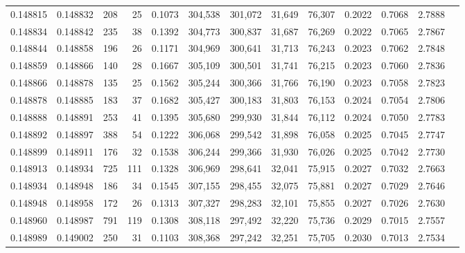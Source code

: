 \begin{tabular}{rrrrrrrrrrrrr}
0.148815 & 0.148832 &   208 &  25 &                                     0.1073 & 304,538 & 301,072 &  31,649 &  76,307 & 0.2022 & 0.7068 & 2.7888 \\
0.148834 & 0.148842 &   235 &  38 &                                     0.1392 & 304,773 & 300,837 &  31,687 &  76,269 & 0.2022 & 0.7065 & 2.7867 \\
0.148844 & 0.148858 &   196 &  26 &                                     0.1171 & 304,969 & 300,641 &  31,713 &  76,243 & 0.2023 & 0.7062 & 2.7848 \\
0.148859 & 0.148866 &   140 &  28 &                                     0.1667 & 305,109 & 300,501 &  31,741 &  76,215 & 0.2023 & 0.7060 & 2.7836 \\
0.148866 & 0.148878 &   135 &  25 &                                     0.1562 & 305,244 & 300,366 &  31,766 &  76,190 & 0.2023 & 0.7058 & 2.7823 \\
0.148878 & 0.148885 &   183 &  37 &                                     0.1682 & 305,427 & 300,183 &  31,803 &  76,153 & 0.2024 & 0.7054 & 2.7806 \\
0.148888 & 0.148891 &   253 &  41 &                                     0.1395 & 305,680 & 299,930 &  31,844 &  76,112 & 0.2024 & 0.7050 & 2.7783 \\
0.148892 & 0.148897 &   388 &  54 &                                     0.1222 & 306,068 & 299,542 &  31,898 &  76,058 & 0.2025 & 0.7045 & 2.7747 \\
0.148899 & 0.148911 &   176 &  32 &                                     0.1538 & 306,244 & 299,366 &  31,930 &  76,026 & 0.2025 & 0.7042 & 2.7730 \\
0.148913 & 0.148934 &   725 & 111 &                                     0.1328 & 306,969 & 298,641 &  32,041 &  75,915 & 0.2027 & 0.7032 & 2.7663 \\
0.148934 & 0.148948 &   186 &  34 &                                     0.1545 & 307,155 & 298,455 &  32,075 &  75,881 & 0.2027 & 0.7029 & 2.7646 \\
0.148948 & 0.148958 &   172 &  26 &                                     0.1313 & 307,327 & 298,283 &  32,101 &  75,855 & 0.2027 & 0.7026 & 2.7630 \\
0.148960 & 0.148987 &   791 & 119 &                                     0.1308 & 308,118 & 297,492 &  32,220 &  75,736 & 0.2029 & 0.7015 & 2.7557 \\
0.148989 & 0.149002 &   250 &  31 &                                     0.1103 & 308,368 & 297,242 &  32,251 &  75,705 & 0.2030 & 0.7013 & 2.7534 \\

\end{tabular}
